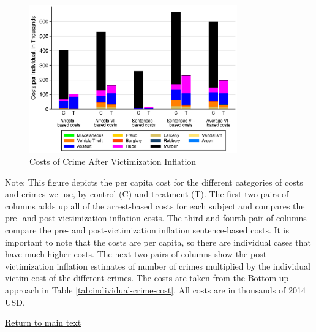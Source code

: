 \documentclass[static]{JJH-Beamer}
\begin{document}
\begin{frame}

\begin{figure} [H]
\caption{Costs of Crime After Victimization Inflation}\label{tab:costs_vi}
\begin{center}
\includegraphics[width=0.8\textwidth]{AppOutput/Crime/costs_vi}
\end{center}
\end{figure}

\end{frame}

{\flushleft \normalsize Note: This figure depicts the per capita cost for the different categories of costs and crimes we use, by control (C) and treatment (T). The first two pairs of columns adds up all of the arrest-based costs for each subject and compares the pre- and post-victimization inflation costs. The third and fourth pair of columns compare the pre- and post-victimization inflation sentence-based costs. It is important to note that the costs are per capita, so there are individual cases that have much higher costs. The next two pairs of columns show the post-victimization inflation estimates of number of crimes multiplied by the individual victim cost of the different crimes. The costs are taken from the Bottom-up approach in Table \ref{tab:individual-crime-cost}. All costs are in thousands of 2014 USD.\\}

\begin{frame}

\begin{center}
\hyperlink{ret:muffin}{\underline{Return to main text}}
\end{center}

\end{frame}
\end{document}
